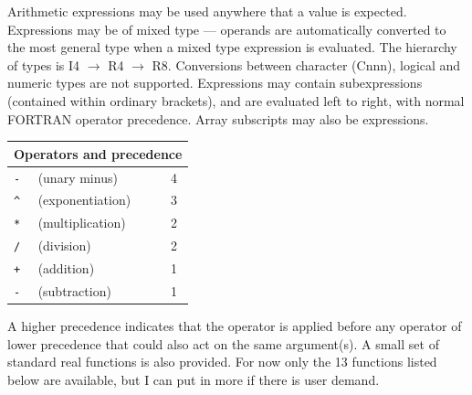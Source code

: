 \documentclass[11pt,twoside]{report}
\begin{document}
Arithmetic expressions may be used anywhere that a value is expected.
Expressions may be of mixed type --- operands
are automatically converted to the most general type when a mixed type
expression is evaluated. The hierarchy of types is
I4 $\rightarrow$ R4 $\rightarrow$ R8. Conversions between character (Cnnn),
logical and numeric types are not supported. Expressions may contain
subexpressions (contained within ordinary brackets), and
are evaluated left to right, with normal FORTRAN operator precedence. Array
subscripts may also be expressions. 

\index{-}\index{*}\index{/}\index{+}
\begin{center}
\begin{tabular}{|lll|} \hline
\multicolumn{3}{|c|}{Operators and precedence}\\
\hline
\verb#-#  & (unary minus)   & 4 \\
\verb#^#  & (exponentiation)   & 3\\
\verb#*#  & (multiplication)   & 2\\
\verb#/#  & (division)   & 2\\
\verb#+#  & (addition)   & 1\\
\verb#-#  & (subtraction)   & 1 \\ \hline
\end{tabular}
\end{center}

A higher precedence indicates that the operator is applied before
any operator of lower precedence that could also act on the same argument(s).
A small set of standard real functions is also provided. For now only the 13
functions listed below are available, but I can put in more if there is 
user demand.
\end{document}
